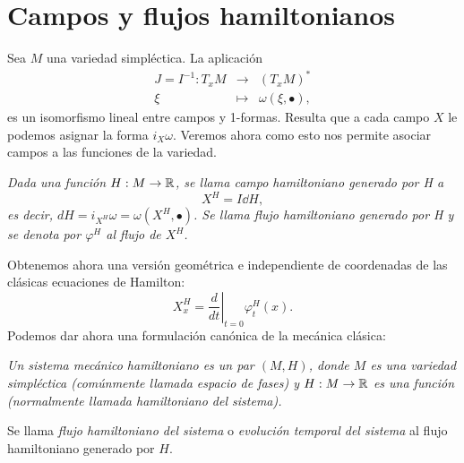 \section{Campos y flujos hamiltonianos}\label{sec:hamilton}
  Sea $M$ una variedad simpléctica. La aplicación 
  \begin{equation*}
    \begin{array}{rcl}
      J=I^{-1}: T_xM & \longrightarrow & (T_xM)^* \\
      \xi & \longmapsto & \omega(\xi,\bullet),
      \end{array} 
  \end{equation*}
es un isomorfismo lineal entre campos y 1-formas. Resulta que a cada campo $X$ le podemos asignar la forma $i_X \omega$. Veremos ahora como esto nos permite asociar campos a las funciones de la variedad.
\begin{defn}
  \em
  Dada una función $H:M \rightarrow \mathbb{R}$, se llama \emph{campo hamiltoniano generado por H} a 
  \begin{equation*}
    X^H=I \dd H,
  \end{equation*}
  es decir, $dH=i_{X^H}\omega=\omega(X^H,\bullet)$.
  Se llama \emph{flujo hamiltoniano generado por H} y se denota por $\varphi^H$ al flujo de $X^H$.
\end{defn}
  Obtenemos ahora una versión geométrica e independiente de coordenadas de las clásicas ecuaciones de Hamilton:
  \begin{equation*}
    X^H_x= \left.\frac{d}{dt}\right| _{t=0}\varphi^H_t(x).
  \end{equation*}
Podemos dar ahora una formulación canónica de la mecánica clásica:
\begin{defn}
  \em
  Un \emph{sistema mecánico hamiltoniano} es un par $(M,H)$, donde $M$ es una variedad simpléctica (comúnmente llamada \emph{espacio de fases}) y $H:M \rightarrow \mathbb{R}$ es una función (normalmente llamada \emph{hamiltoniano} del sistema).

  Se llama \emph{flujo hamiltoniano del sistema} o \emph{evolución temporal del sistema} al flujo hamiltoniano generado por $H$.
\end{defn}

